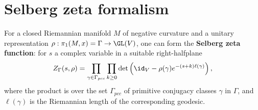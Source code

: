 \documentclass{amsart}
\begin{document}
%

\section{Selberg zeta formalism}
For a closed Riemannian manifold $M$ of negative curvature and a unitary representation $\rho : \pimx = \Gamma \to \GL(V)$, one can form the \textbf{Selberg zeta function}: for $s$ a complex variable in a suitable right-halfplane
	\begin{align*}
		Z_\Gamma(s, \rho) = \prod_{\gamma \in \Gamma_{pcc}} \prod_{k \geq 0} \det \left( \id_V - \rho(\gamma) e^{-(s+k) \ell(\gamma)} \right),
	\end{align*}
where the product is over the set $\Gamma_{pcc}$ of primitive conjugacy classes $\gamma$ in $\Gamma$, and $\ell(\gamma)$ is the Riemannian length of the corresponding geodesic. 
\end{document}
